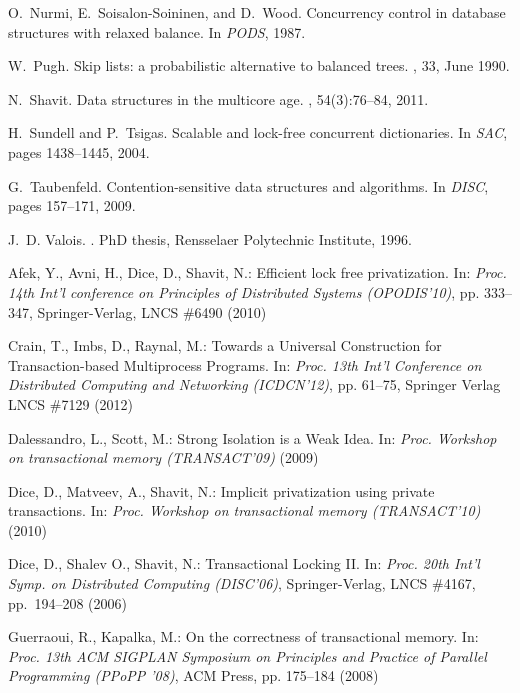 \begin{thebibliography}{99}
{
O.~Nurmi, E.~Soisalon-Soininen, and D.~Wood.
\newblock Concurrency control in database structures with relaxed balance.
\newblock In {\em PODS}, 1987.

W.~Pugh.
\newblock Skip lists: a probabilistic alternative to balanced trees.
, 33, June 1990.

N.~Shavit.
\newblock Data structures in the multicore age.
, 54(3):76--84, 2011.

H.~Sundell and P.~Tsigas.
\newblock Scalable and lock-free concurrent dictionaries.
\newblock In {\em SAC}, pages 1438--1445, 2004.

G.~Taubenfeld.
\newblock Contention-sensitive data structures and algorithms.
\newblock In {\em DISC}, pages 157--171, 2009.

J.~D. Valois.
.
\newblock PhD thesis, Rensselaer Polytechnic Institute, 1996.









 Afek, Y.,  Avni, H.,   Dice, D.,  Shavit, N.: Efficient lock free privatization. 
In: {\it Proc.  14th Int'l conference on Principles of Distributed Systems 
(OPODIS'10)}, pp. 333--347, Springer-Verlag,  LNCS \#6490 (2010) 

Crain, T., Imbs, D.,  Raynal, M.: 
Towards a Universal Construction for Transaction-based Multiprocess Programs.
In: {\it Proc. 13th Int'l Conference on Distributed Computing and Networking (ICDCN'12)}, 
pp. 61--75, Springer Verlag LNCS \#7129 (2012) 

Dalessandro, L., Scott, M.:
Strong Isolation is a Weak Idea. 
In: {\it Proc. Workshop on transactional memory (TRANSACT'09)} (2009)

Dice, D., Matveev, A.,  Shavit, N.:
Implicit privatization using private transactions. 
In: {\it Proc. Workshop on transactional memory (TRANSACT'10)} (2010)

Dice, D., Shalev O., Shavit, N.:
Transactional Locking II.
In: {\em Proc. 20th Int'l Symp. on Distributed Computing (DISC'06)},
Springer-Verlag, LNCS \#4167, pp.~194--208 (2006)

Guerraoui, R., Kapalka, M.:  On the correctness of transactional memory. 
In: {\it  Proc. 13th ACM SIGPLAN Symposium on Principles and Practice of 
Parallel Programming (PPoPP '08)},  ACM Press, pp.  175--184 (2008)

}
\end{thebibliography}
